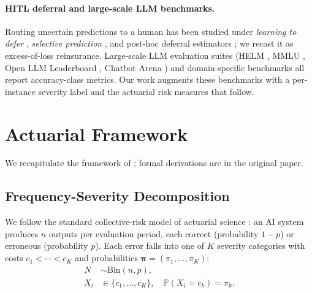 \documentclass[11pt]{article}
\newcommand{\bpi}{\boldsymbol{\pi}}
\begin{document}
\paragraph{HITL deferral and large-scale LLM benchmarks.}
Routing uncertain predictions to a human has been studied under
\emph{learning to defer}
\citep{madras2018predict,mozannar2020consistent}, \emph{selective
prediction} \citep{elyaniv2010selective,geifman2017selective}, and
post-hoc deferral estimators
\citep{narasimhan2022posthoc,okati2021differentiable}; we recast
it as excess-of-loss reinsurance. Large-scale LLM evaluation
suites (HELM \citep{liang2023helm}, MMLU
\citep{hendrycks2021mmlu}, Open LLM Leaderboard
\citep{beeching2023openllm}, Chatbot Arena
\citep{chiang2024chatbot}) and domain-specific benchmarks
\citep{islam2023financebench,chen2021finqa,jin2021medqa,kazi2024medcalc,hendrycks2021cuad,koreeda2021contractnli}
all report accuracy-class metrics. Our work augments these
benchmarks with a per-instance severity label and the actuarial
risk measures that follow.


\section{Actuarial Framework}
\label{sec:framework}

We recapitulate the framework of \citet{beauchemin2026position};
formal derivations are in the original paper.

\subsection{Frequency-Severity Decomposition}

We follow the standard collective-risk model of actuarial science
\citep{klugman2012loss}: an AI system produces $n$ outputs per
evaluation period, each correct (probability $1-p$) or erroneous
(probability $p$). Each error falls into one of $K$ severity
categories with costs $c_1 < \cdots < c_K$ and probabilities
$\bpi = (\pi_1, \ldots, \pi_K)$:
\begin{align}
  N &\sim \mathrm{Bin}(n, p), \label{eq:frequency} \\
  X_i &\in \{c_1, \ldots, c_K\}, \quad \mathbb{P}(X_i = c_k) = \pi_k. \label{eq:severity}
\end{align}
\end{document}
